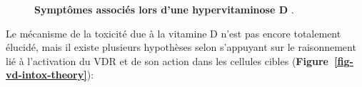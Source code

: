 \documentclass[
  a4paper,
  DIV=11,
  numbers=noendperiod,
  listof=totoc]{scrreprt}
\begin{document}
\begin{figure}


\caption[Symptômes associés lors d'une hypervitaminose
D.]{\label{fig-hypervitaminose-d}\textbf{Symptômes associés lors d'une
hypervitaminose D} \autocite{Janoušek.2022}.}

\end{figure}%

Le mécanisme de la toxicité due à la vitamine D n'est pas encore
totalement élucidé, mais il existe plusieurs hypothèses selon
\textcite{Jones.2008} s'appuyant sur le raisonnement lié à l'activation
du \ac{VDR} et de son action dans les cellules cibles
\autocite{Alshahrani.2013,Janoušek.2022}
(\textbf{Figure~\ref{fig-vd-intox-theory}}):
\end{document}

